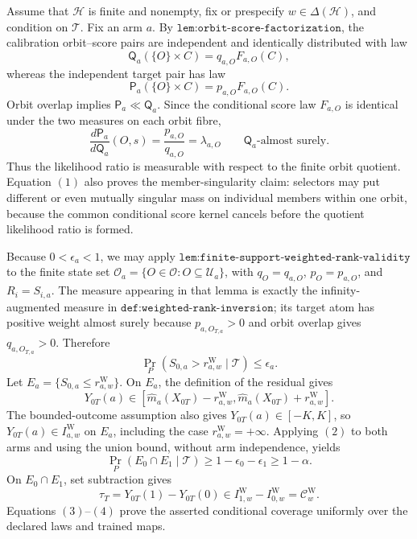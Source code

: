 Assume that \(\mathcal H\) is finite and nonempty, fix or prespecify \(w\in\Delta(\mathcal H)\), and condition on \(\mathcal T\). Fix an arm \(a\). By \(\texttt{lem:orbit-score-factorization}\), the calibration orbit--score pairs are independent and identically distributed with law
\[
\mathsf Q_a(\{O\}\times C)=q_{a,O}F_{a,O}(C),
\]
whereas the independent target pair has law
\[
\mathsf P_a(\{O\}\times C)=p_{a,O}F_{a,O}(C).
\]
Orbit overlap implies \(\mathsf P_a\ll\mathsf Q_a\). Since the conditional score law \(F_{a,O}\) is identical under the two measures on each orbit fibre,
\[
\frac{d\mathsf P_a}{d\mathsf Q_a}(O,s)=\frac{p_{a,O}}{q_{a,O}}=\lambda_{a,O}\qquad\mathsf Q_a\text{-almost surely}.\tag{1}
\]
Thus the likelihood ratio is measurable with respect to the finite orbit quotient. Equation \((1)\) also proves the member-singularity claim: selectors may put different or even mutually singular mass on individual members within one orbit, because the common conditional score kernel cancels before the quotient likelihood ratio is formed.

Because \(0<\epsilon_a<1\), we may apply \(\texttt{lem:finite-support-weighted-rank-validity}\) to the finite state set \(\mathcal O_a=\{O\in\mathcal O:O\subseteq\mathcal U_a\}\), with \(q_O=q_{a,O}\), \(p_O=p_{a,O}\), and \(R_i=S_{i,a}\). The measure appearing in that lemma is exactly the infinity-augmented measure in \(\texttt{def:weighted-rank-inversion}\); its target atom has positive weight almost surely because \(p_{a,O_{T,a}}>0\) and orbit overlap gives \(q_{a,O_{T,a}}>0\). Therefore
\[
\Pr_P\!\left(S_{0,a}>r^{\mathrm W}_{a,w}\mid\mathcal T\right)\le\epsilon_a.\tag{2}
\]
Let \(E_a=\{S_{0,a}\le r^{\mathrm W}_{a,w}\}\). On \(E_a\), the definition of the residual gives
\[
Y_{0T}(a)\in[\widehat m_a(X_{0T})-r^{\mathrm W}_{a,w},\widehat m_a(X_{0T})+r^{\mathrm W}_{a,w}].
\]
The bounded-outcome assumption also gives \(Y_{0T}(a)\in[-K,K]\), so \(Y_{0T}(a)\in I^{\mathrm W}_{a,w}\) on \(E_a\), including the case \(r^{\mathrm W}_{a,w}=+\infty\). Applying \((2)\) to both arms and using the union bound, without arm independence, yields
\[
\Pr_P(E_0\cap E_1\mid\mathcal T)\ge1-\epsilon_0-\epsilon_1\ge1-\alpha.\tag{3}
\]
On \(E_0\cap E_1\), set subtraction gives
\[
\tau_T=Y_{0T}(1)-Y_{0T}(0)\in I^{\mathrm W}_{1,w}-I^{\mathrm W}_{0,w}=\mathcal C^{\mathrm W}_w.\tag{4}
\]
Equations \((3)\)--\((4)\) prove the asserted conditional coverage uniformly over the declared laws and trained maps.

